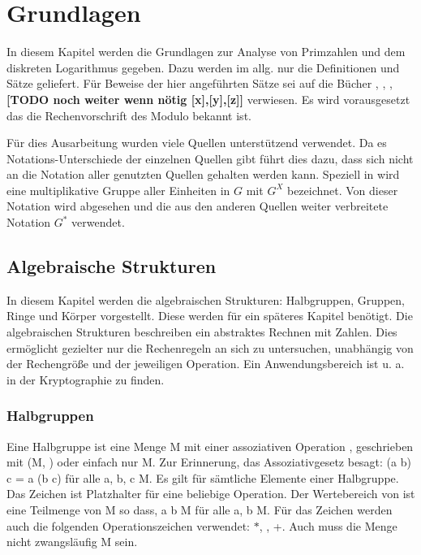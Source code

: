 \section{Grundlagen}
	In diesem Kapitel werden die Grundlagen zur Analyse von Primzahlen und dem diskreten Logarithmus gegeben. Dazu werden im allg. nur die Definitionen und Sätze geliefert. Für Beweise der hier angeführten Sätze sei auf die Bücher \cite{Kryptografie:in:Theorie:und:Praxis}, \cite{Erste:Hilfe:in:Linearer:Algebra}, \cite{Kryptographie:und:IT-Sicherheit}, \cite{Information:und:Kommunikation} \textbf{[TODO noch weiter wenn nötig [x],[y],[z]]} verwiesen. Es wird vorausgesetzt das die Rechenvorschrift des Modulo bekannt ist.
	
	Für dies Ausarbeitung wurden viele Quellen unterstützend verwendet. Da es Notations-Unterschiede der einzelnen Quellen gibt führt dies dazu, dass sich nicht an die Notation aller genutzten Quellen gehalten werden kann. Speziell in \cite{Erste:Hilfe:in:Linearer:Algebra} wird eine multiplikative Gruppe aller Einheiten in $G$ mit $G^X$ bezeichnet. Von dieser Notation wird abgesehen und die aus den anderen Quellen weiter verbreitete Notation $G^*$ verwendet.
	
	\subsection{Algebraische Strukturen}
		In diesem Kapitel werden die algebraischen Strukturen: Halbgruppen, Gruppen, Ringe und Körper vorgestellt. Diese werden für ein späteres Kapitel benötigt. Die algebraischen Strukturen beschreiben ein abstraktes Rechnen mit Zahlen. Dies ermöglicht gezielter nur die Rechenregeln an sich zu untersuchen, unabhängig von der Rechengröße und der jeweiligen Operation. Ein Anwendungsbereich ist u. a. in der Kryptographie zu finden.~\cite{Kryptographie:und:Algorithmen}
	
		\subsubsection{Halbgruppen}
			Eine Halbgruppe ist eine Menge M mit einer assoziativen Operation \mycircOhne, geschrieben mit (M, \mycircOhne) oder einfach nur M. Zur Erinnerung, das Assoziativgesetz besagt: (a \mycirc b) \mycirc c = a \mycirc (b \mycirc c) für alle a, b, c \myin M. Es gilt für sämtliche Elemente einer Halbgruppe. Das Zeichen \mycirc ist Platzhalter für eine beliebige Operation. Der Wertebereich von \mycirc ist eine Teilmenge von M so dass, a \mycirc b \myin M für alle a, b \myin M. Für das Zeichen \mycirc werden auch die folgenden Operationszeichen verwendet: $*$, \mycdotOhne, +. Auch muss die Menge nicht zwangsläufig M sein.~\cite{Erste:Hilfe:in:Linearer:Algebra}
			
